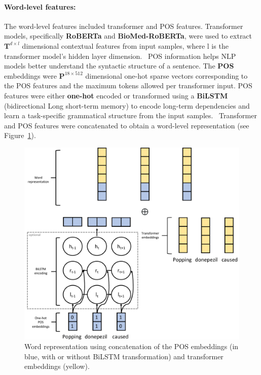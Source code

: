 \documentclass[11pt]{article}
\begin{document}
\paragraph{Word-level features: }
%
The word-level features included transformer and POS features.
Transformer models, specifically \textbf{RoBERTa} and \textbf{BioMed-RoBERTa}, were used to extract $\mathbf{T}^{d \times l}$ dimensional contextual features from input samples, where l is the transformer model's hidden layer dimension.~\cite{liu2019roberta,gururangan2020don}
POS information helps NLP models better understand the syntactic structure of a sentence.
The \textbf{POS} embeddings were $\mathbf{P}^{18 \times 512}$ dimensional one-hot sparse vectors corresponding to the POS features and the maximum tokens allowed per transformer input. 
POS features were either \textbf{one-hot} encoded or transformed using a \textbf{BiLSTM} (bidirectional Long short-term memory) to encode long-term dependencies and learn a task-specific grammatical structure from the input samples.~\cite{hochreiter1997long}
Transformer and POS features were concatenated to obtain a word-level representation (see Figure~\ref{fig:task2_word}).
\begin{figure}[!htbp]
    \centering
    \includegraphics[width=\columnwidth]{figures/word_arch.pdf}
    \caption{Word representation using concatenation of the POS embeddings (in blue, with or without BiLSTM transformation) and transformer embeddings (yellow).}
    \label{fig:task2_word}
\end{figure}
%
%
%
\end{document}

